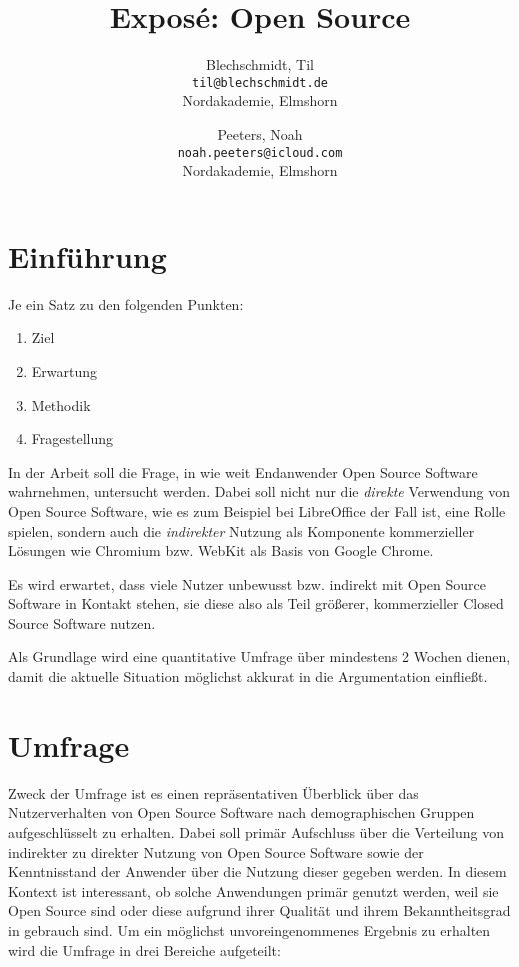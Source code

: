 \documentclass[a4paper]{article}
\title{Exposé: Open Source}
\author{
  Blechschmidt, Til\\
  \texttt{til@blechschmidt.de}\\
  Nordakademie, Elmshorn
  \and
  Peeters, Noah\\
  \texttt{noah.peeters@icloud.com}\\
  Nordakademie, Elmshorn
}
\begin{document}
	\maketitle
	
	\section{Einführung}
	   Je ein Satz zu den folgenden Punkten:
	   \begin{enumerate}
	       \item Ziel
	       \item Erwartung
	       \item Methodik
	       \item Fragestellung
	   \end{enumerate}
	
	   In der Arbeit soll die Frage, in wie weit Endanwender Open Source Software wahrnehmen, untersucht werden. Dabei soll nicht nur die \emph{direkte} Verwendung von Open Source Software, wie es zum Beispiel bei LibreOffice der Fall ist, eine Rolle spielen, sondern auch die \emph{indirekter} Nutzung als Komponente kommerzieller Lösungen wie Chromium bzw. WebKit als Basis von Google Chrome.
	   
	   Es wird erwartet, dass viele Nutzer unbewusst bzw. indirekt mit Open Source Software in Kontakt stehen, sie diese also als Teil größerer, kommerzieller Closed Source Software nutzen.
	   
	   Als Grundlage wird eine quantitative Umfrage über mindestens 2 Wochen dienen, damit die aktuelle Situation möglichst akkurat in die Argumentation einfließt.
	
	\section{Umfrage}
		Zweck der Umfrage ist es einen repräsentativen Überblick über das Nutzerverhalten von Open Source Software nach demographischen Gruppen aufgeschlüsselt zu erhalten. Dabei soll primär Aufschluss über die Verteilung von indirekter zu direkter Nutzung von Open Source Software sowie der Kenntnisstand der Anwender über die Nutzung dieser gegeben werden. In diesem Kontext ist interessant, ob solche Anwendungen primär genutzt werden, weil sie Open Source sind oder diese aufgrund ihrer Qualität und ihrem Bekanntheitsgrad in gebrauch sind.
		Um ein möglichst unvoreingenommenes Ergebnis zu erhalten wird die Umfrage in drei Bereiche aufgeteilt:
	   
\end{document}

